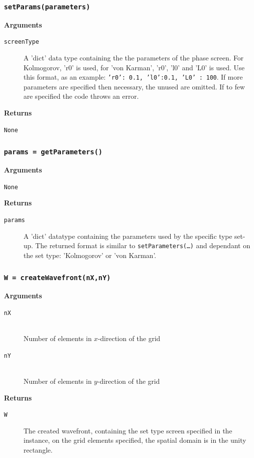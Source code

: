 \documentclass{article}
\begin{document}
\subsubsection*{\texttt{setParams(parameters)}}
\textbf{Arguments}
\begin{description}
	\item[\texttt{screenType}]
	A 'dict' data type containing the the parameters of the phase screen. For Kolmogorov, 'r0' is used, for 'von Karman', 'r0', 'l0' and 'L0' is used. Use this format, as an example: \texttt{{'r0': 0.1, 'l0':0.1, 'L0' : 100}}. If more parameters are specified then necessary, the unused are omitted. If to few are specified the code throws an error.
\end{description}
\textbf{Returns}
\begin{description}
	\item[\texttt{None}]
\end{description}

\newpage
\subsubsection*{\texttt{params = getParameters()}}
\textbf{Arguments}
\begin{description}
	\item[\texttt{None}]
\end{description}
\textbf{Returns}
\begin{description}
	\item[\texttt{params}]
	A 'dict' datatype containing the parameters used by the specific type set-up. The returned format is similar to \texttt{setParameters(\dots)} and dependant on the set type: 'Kolmogorov' or 'von Karman'.
\end{description}

\newpage
\subsubsection*{\texttt{W = createWavefront(nX,nY)}}
\textbf{Arguments}
\begin{description}
  \item[\texttt{nX}] \hfill \\
  Number of elements in $x$-direction of the grid
  \item[\texttt{nY}] \hfill \\
 	Number of elements in $y$-direction of the grid
\end{description}
\textbf{Returns}
\begin{description}
	\item[\texttt{W}]
	The created wavefront, containing the set type screen specified in the instance, on the grid elements specified, the spatial domain is in the unity rectangle.
\end{description}
\end{document}
